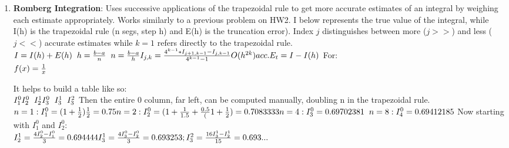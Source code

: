 \documentclass[fontsize=5pt]{scrartcl}
\begin{document}
\begin{multicols}{3}
\begin{enumerate}
      \item \textbf{Romberg Integration}: Uses successive applications of the trapezoidal rule to get more accurate
        estimates of an integral by weighing each estimate appropriately. Works similarly to a previous problem on 
        HW2. I below represents the true value of the integral, while I(h) is the trapezoidal rule (n segs, step h)
        and E(h) is the truncation error). Index $j$ distinguishes between more ($j>>$) and less ($j<<$) accurate 
        estimates while $k=1$ refers directly to the trapezoidal rule.\\
        \begin{math}
          I=I(h)+E(h) \hspace{2mm} h=\frac{b-a}{n} \hspace{2mm} n=\frac{b-a}{h} \\
          I_{j,k}=\frac{4^{k-1}*I_{j+1,k-1} - I_{j,k-1}}{4^{k-1}-1} \\
          O(h^{2k}) acc. \\
          E_t=I-I(h) \\
         \end{math} 
         For:\\
         \begin{math}
           f(x) = \frac{1}{x} \\
         \end{math}

         It helps to build a table like so: \\
         \begin{math}
           I^0_1 \\
           I^0_2\hspace{2mm}I^1_2 \\
           I^0_3\hspace{2mm}I^1_3\hspace{2mm}I^2_3 \\
         \end{math}
         Then the entire 0 column, far left, can be computed manually, doubling n in the trapezoidal rule. \\
         \begin{math}
           n=1: I^0_1 = (1+\frac{1}{2})\frac{1}{2} = 0.75 \\
           n=2: I^0_2 = (1+\frac{1}{1.5}+\frac{0.5}(1+\frac{1}{2})=0.7083333\\
           n=4: I^0_3 = 0.69702381 \hspace{2mm}%
           n=8: I^0_4 = 0.69412185 \\
         \end{math}
         Now starting with $I^0_1$ and $I^0_2$: \\
         \begin{math}
           I^1_2=\frac{4I^0_2-I^0_1}{3} = 0.694444 \\
           I^1_3=\frac{4I^0_3-I^0_2}{3}=0.693253;\vspace{2mm} I^2_3=\frac{16I^1_3-I^1_2}{15}=0.693... \\
         \end{math}




\end{enumerate}
\end{multicols}
\end{document}
